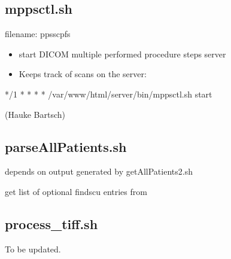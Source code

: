 \documentclass[letterpaper,10pt,english]{sphinxmanual}
\begin{document}
\sphinxstepscope


\subsection{mppsctl.sh}
\label{\detokenize{Architecture/scripts/mppsctl:mppsctl-sh}}\label{\detokenize{Architecture/scripts/mppsctl::doc}}
\sphinxAtStartPar
filename: ppsscpfs
\begin{description}
\begin{itemize}
\item {} 
\sphinxAtStartPar
start DICOM multiple performed procedure steps server

\item {} 
\sphinxAtStartPar
Keeps track of scans on the server:

\end{itemize}

\end{description}

\begin{sphinxVerbatim}[commandchars=\\\{\}]
*/1 * * * * /var/www/html/server/bin/mppsctl.sh start
\end{sphinxVerbatim}

\sphinxAtStartPar
(Hauke Bartsch)

\sphinxstepscope


\subsection{parseAllPatients.sh}
\label{\detokenize{Architecture/scripts/parseAllPatients:parseallpatients-sh}}\label{\detokenize{Architecture/scripts/parseAllPatients::doc}}
\sphinxAtStartPar
depends on output generated by getAllPatients2.sh

\sphinxAtStartPar
get list of optional findscu entries from 

\sphinxstepscope


\subsection{process\_tiff.sh}
\label{\detokenize{Architecture/scripts/process_tiff:process-tiff-sh}}\label{\detokenize{Architecture/scripts/process_tiff::doc}}
\sphinxAtStartPar
To be updated.

\sphinxstepscope
\end{document}
